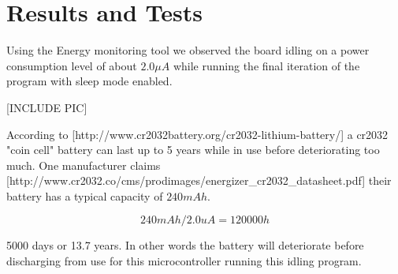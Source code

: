 \chapter{Results and Tests}
\label{chap:results}

Using the Energy monitoring tool we observed the board idling on a power consumption level of about
$2.0 \mu A$ while running the final iteration of the program with sleep mode enabled.

[INCLUDE PIC]

According to [http://www.cr2032battery.org/cr2032-lithium-battery/] a cr2032 "coin cell" battery can
last up to 5 years while in use before deteriorating too much. One manufacturer claims
[http://www.cr2032.co/cms/prodimages/energizer\_cr2032\_datasheet.pdf] their battery has a typical capacity of $240 mAh$.

\[
	240 mAh / 2.0 uA = 120 000 h
\]

5000 days or 13.7 years. In other words the battery will deteriorate before discharging from use for this microcontroller running this idling program.
